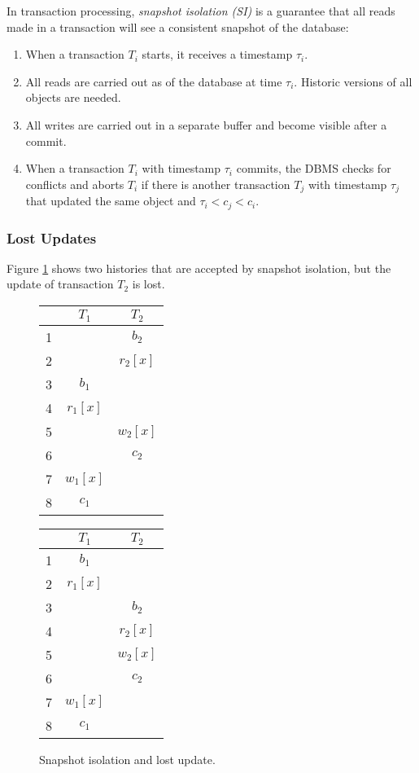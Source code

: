 In transaction processing, \emph{snapshot isolation (SI)} is a guarantee that all reads made in a transaction will see a consistent snapshot of the database:
\begin{enumerate}
\item When a transaction $T_i$ starts, it receives a timestamp $\tau_i$.
\item All reads are carried out as of the database at time $\tau_i$. Historic versions of all objects are needed.
\item All writes are carried out in a separate buffer and become visible after a commit.
\item When a transaction $T_i$ with timestamp $\tau_i$ commits, the DBMS checks for conflicts and aborts $T_i$ if there is another transaction $T_j$ with timestamp $\tau_j$ that updated the same object and $\tau_i < c_j < c_i$.
\end{enumerate}


\subsubsection{Lost Updates}

Figure \ref{fig_lost_update} shows two histories that are accepted by snapshot isolation, but the update of transaction $T_2$ is lost.

\begin{figure}[htbp]
\begin{center}
\begin{tabular}{|c|c|c|}\hline
  &  $T_1$   & $T_2$    \\\hline\hline
1 &          & $b_2$    \\
2 &          & $r_2[x]$ \\
3 & $b_1$    &          \\
4 & $r_1[x]$ &          \\
5 &          & $w_2[x]$ \\
6 &          & $c_2$    \\
7 & $w_1[x]$ &          \\
8 & $c_1$    &          \\\hline
\end{tabular}
\hspace{1em}
\begin{tabular}{|c|c|c|}\hline
  &  $T_1$   & $T_2$    \\\hline\hline
1 & $b_1$    &          \\
2 & $r_1[x]$ &          \\
3 &          & $b_2$    \\
4 &          & $r_2[x]$ \\
5 &          & $w_2[x]$ \\
6 &          & $c_2$    \\
7 & $w_1[x]$ &          \\
8 & $c_1$    &          \\\hline
\end{tabular}
\end{center}
\caption[Snapshot Isolation and Lost Update]{Snapshot isolation and lost update.}
\label{fig_lost_update}
\end{figure}

